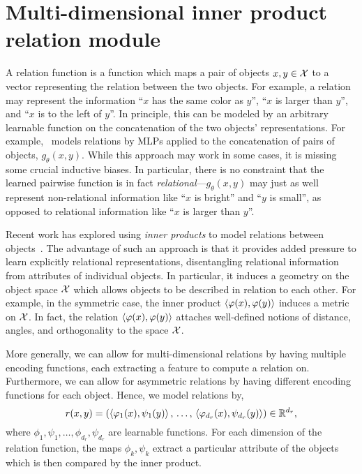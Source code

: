 \section{Multi-dimensional inner product relation module}\label{sec:mhr}

A relation function is a function which maps a pair of objects $x, y \in {\mathcal{X}}$ to a vector representing the relation between the two objects. For example, a relation may represent the information ``$x$ has the same color as $y$'', ``$x$ is larger than $y$'', and ``$x$ is to the left of $y$''. In principle, this can be modeled by an arbitrary learnable function on the concatenation of the two objects' representations. For example,~\citep{santoroSimpleNeural2017} models relations by MLPs applied to the concatenation of pairs of objects, $g_\theta(x, y)$. While this approach may work in some cases, it is missing some crucial inductive biases. In particular, there is no constraint that the learned pairwise function is in fact \textit{relational}---$g_\theta(x, y)$ may just as well represent non-relational information like ``$x$ is bright'' and ``$y$ is small'', as opposed to relational information like ``$x$ is larger than $y$''.

Recent work has explored using \textit{inner products} to model relations between objects~\citep{webbEmergentSymbols2021, kergNeuralArchitecture2022, altabaaAbstractorsTransformer2023}. The advantage of such an approach is that it provides added pressure to learn explicitly relational representations, disentangling relational information from attributes of individual objects. In particular, it induces a geometry on the object space ${\mathcal{X}}$ which allows objects to be described in relation to each other. For example, in the symmetric case, the inner product $\left \langle \varphi(x), \varphi(y) \right\rangle$ induces a metric on ${\mathcal{X}}$. In fact, the relation $\left \langle \varphi(x), \varphi(y) \right\rangle$ attaches well-defined notions of distance, angles, and orthogonality to the space ${\mathcal{X}}$.

More generally, we can allow for multi-dimensional relations by having multiple encoding functions, each extracting a feature to compute a relation on. Furthermore, we can allow for asymmetric relations by having different encoding functions for each object. Hence, we model relations by,
\begin{equation}\label{eq:relation_function}
    r(x, y) = \paren{
        \iprod{\phi_1(x)}{\psi_1(y)},\, \ldots,\, \iprod{\phi_{d_r}(x)}{\psi_{d_r}(y)}} \in \reals^{d_r},
\end{equation}
where $\phi_1, \psi_1, \ldots, \phi_{d_r}, \psi_{d_r}$ are learnable functions. For each dimension of the relation function, the maps $\phi_k, \psi_k$ extract a particular attribute of the objects which is then compared by the inner product.

